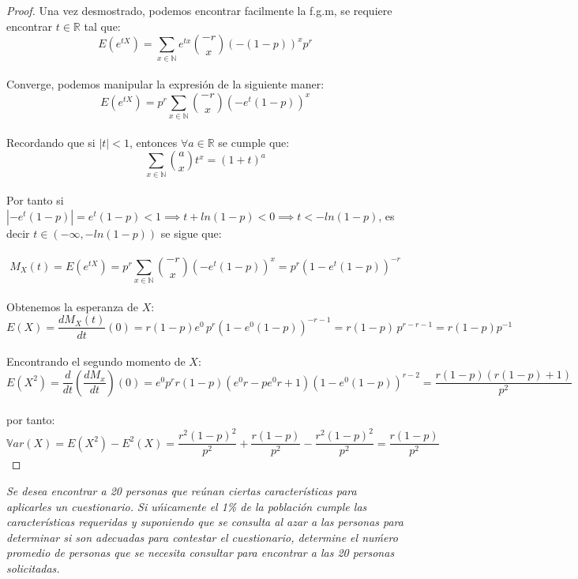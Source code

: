 \documentclass[11pt]{article}
\newcommand{\R}{\mathbb{R}}
\newcommand{\N}{\mathbb{N}}
\newcommand{\var}{\mathbb{V}ar}
\begin{document}
\begin{proof}
Una vez desmostrado, podemos encontrar facilmente la f.g.m, se requiere encontrar $t\in \R$ tal que:\,\\
\begin{equation*}
    E(e^{tX})=\sum_{x\in \N}e^{tx} \binom{-r}{x}(-(1 - p))^x p^r
\end{equation*}\,\\
Converge, podemos manipular la expresi\'on de la siguiente maner:\,\\
\begin{equation*}
     E(e^{tX})=p^{r}\sum_{x\in \N} \binom{-r}{x}(-e^t(1 - p))^x 
\end{equation*}\,\\
Recordando que si $|t|<1$, entonces $\forall a\in \R$ se cumple que:\,\\
\begin{equation*}
    \sum_{x\in \N}\binom{a}{x}t^x=(1+t)^a
\end{equation*}\,\\
Por tanto si $|-e^t(1-p)|=e^t(1-p)<1\implies t+ln(1-p)<0\implies t<-ln(1-p)$, es decir $t\in (-\infty,-ln(1-p))$ se sigue que:\,\\
\,\\
\begin{equation*}
   M_{X}(t)=E(e^{tX})=p^{r}\sum_{x\in \N} \binom{-r}{x}(-e^t(1 - p))^x =p^{r}(1-e^t(1-p))^{-r}
\end{equation*}\,\\
Obtenemos la esperanza de $X$:\,\\
\begin{equation*}
    E(X)=\frac{dM_{X}(t)}{dt}(0)=r(1-p)e^0\,p^{r}(1-e^0(1-p))^{-r-1}=r(1-p)\,p^{r-r-1}=r(1-p)p^{-1}
\end{equation*}\,\\
Encontrando el segundo momento de $X$:\,\\
\begin{equation*}
    E(X^2)=\frac{d}{dt}\left(\frac{dM_{x}}{dt}\right)(0)=e^0p^r r(1-p)(e^0r-pe^0r+1)(1-e^0(1-p))^{r-2}=\frac{r(1-p)(r(1-p)+1)}{p^2}
\end{equation*}\,\\
por tanto:\,\\
\begin{equation*}
    \var(X)=E(X^2)-E^2(X)=\frac{r^2(1-p)^2}{p^2}+\frac{r(1-p)}{p^2}-\frac{r^2(1-p)^2}{p^2}=\frac{r(1-p)}{p^2}
\end{equation*}
\end{proof}
\begin{tcolorbox}[title = \textcolor{black}{\textcolor{white}{Problema 4}}]
\textit{Se desea encontrar a 20 personas que re\'unan ciertas caracter\'isticas para aplicarles un cuestionario. Si u\'nicamente el 1\% de la poblaci\'on cumple las caracter\'isticas requeridas y suponiendo que se consulta al azar a las personas para determinar si son adecuadas para contestar el cuestionario, determine el nu\'mero promedio de personas que se necesita consultar para encontrar a las 20 personas solicitadas.
}
\end{tcolorbox}
\end{document}
